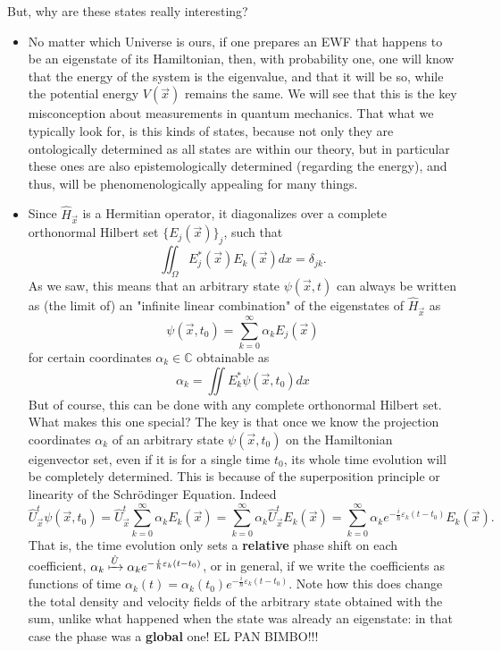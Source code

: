 \documentclass[11pt, a4paper]{article} %
\newcommand{\C}{\mathbb{C}}
\begin{document}
But, why are these states really interesting?
\begin{itemize}
\item No matter which Universe is ours, if one prepares an EWF that happens to be an eigenstate of its Hamiltonian, then, with probability one, one will know that the energy of the system is the eigenvalue, and that it will be so, while the potential energy $V(\vec{x})$ remains the same. We will see that this is the key misconception about measurements in quantum mechanics. That what we typically look for, is this kinds of states, because not only they are ontologically determined as all states are within our theory, but in particular these ones are also epistemologically determined (regarding the energy), and thus, will be phenomenologically appealing for many things.
\item Since $\hat{H}_{\vec{x}}$ is a Hermitian operator, it diagonalizes over a complete orthonormal Hilbert set $\{E_j(\vec{x})\}_j$, such that
\begin{equation}
\iint_\Omega E_j^*(\vec{x})E_k(\vec{x}) dx = \delta_{jk}.
\end{equation}
As we saw, this means that an arbitrary state $\psi(\vec{x},t)$ can always be written as (the limit of) an "infinite linear combination" of the eigenstates of $\hat{H}_{\vec{x}}$ as
\begin{equation}
\psi(\vec{x},t_0)=\sum_{k=0}^\infty \alpha_k E_j(\vec{x})
\end{equation}
for certain coordinates $\alpha_k\in\C$ obtainable as
\begin{equation}
\alpha_k=\iint E_k^*\psi(\vec{x},t_0)dx
\end{equation}
But of course, this can be done with any complete orthonormal Hilbert set. What makes this one special? The key is that once we know the projection coordinates $\alpha_k$ of an arbitrary state $\psi(\vec{x},t_0)$ on the Hamiltonian eigenvector set, even if it is for a single time $t_0$, its whole time evolution will be completely determined. This is because of the superposition principle or linearity of the Schrödinger Equation. Indeed
\begin{equation}
\hat{U}^t_{\vec{x}}\psi(\vec{x},t_0)=\hat{U}^t_{\vec{x}}\sum_{k=0}^\infty \alpha_k E_k(\vec{x})=\sum_{k=0}^\infty \alpha_k \hat{U}^t_{\vec{x}}E_k(\vec{x})=\sum_{k=0}^\infty \alpha_k e^{-\frac{i}{\hbar}\varepsilon_k(t-t_0)} E_k(\vec{x}).
\end{equation}
That is, the time evolution only sets a {\bf relative} phase shift on each coefficient, $\alpha_k\xmapsto[]{\hat{U}}\alpha_k e^{-\frac{i}{\hbar}\varepsilon_k(t-t_0)}$, or in general, if we write the coefficients as functions of time $\alpha_k(t)=\alpha_k(t_0) e^{-\frac{i}{\hbar}\varepsilon_k(t-t_0)}$. Note how this does change the total density and velocity fields of the arbitrary state obtained with the sum, unlike what happened when the state was already an eigenstate: in that case the phase was a {\bf global} one! EL PAN BIMBO!!!


\end{itemize}
\end{document}
